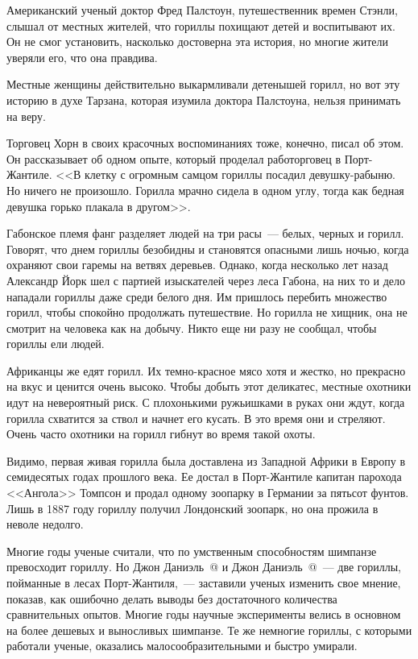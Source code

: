 \documentclass[12pt,a4paper,twoside,openany,svgnames]{memoir}
\makeatletter
\newcommand*{\rom}[1]{\expandafter\@slowromancap\romannumeral #1@}
\makeatother
\begin{document}
Американский ученый доктор Фред Палстоун, путешественник времен Стэнли, слышал от местных жителей, что гориллы похищают детей и воспитывают их. Он не смог установить, насколько достоверна эта история, но многие жители уверяли его, что она правдива.

Местные женщины действительно выкармливали детенышей горилл, но вот эту историю в духе Тарзана, которая изумила доктора Палстоуна, нельзя принимать на веру.

Торговец Хорн в своих красочных воспоминаниях тоже, конечно, писал об этом. Он рассказывает об одном опыте, который проделал работорговец в Порт-Жантиле. <<В клетку с огромным самцом гориллы посадил девушку-рабыню. Но ничего не произошло. Горилла мрачно сидела в одном углу, тогда как бедная девушка горько плакала в другом>>.

Габонское племя фанг разделяет людей на три расы~--- белых, черных и горилл. Говорят, что днем гориллы безобидны и становятся опасными лишь ночью, когда охраняют свои гаремы на ветвях деревьев. Однако, когда несколько лет назад Александр Йорк шел с партией изыскателей через леса Габона, на них то и дело нападали гориллы даже среди белого дня. Им пришлось перебить множество горилл, чтобы спокойно продолжать путешествие. Но горилла не хищник, она не смотрит на человека как на добычу. Никто еще ни разу не сообщал, чтобы гориллы ели людей.

Африканцы же едят горилл. Их темно-красное мясо хотя и жестко, но прекрасно на вкус и ценится очень высоко. Чтобы добыть этот деликатес, местные охотники идут на невероятный риск. С плохонькими ружьишками в руках они ждут, когда горилла схватится за ствол и начнет его кусать. В это время они и стреляют. Очень часто охотники на горилл гибнут во время такой охоты.

Видимо, первая живая горилла была доставлена из Западной Африки в Европу в семидесятых годах прошлого века. Ее достал в Порт-Жантиле капитан парохода <<Ангола>> Томпсон и продал одному зоопарку в Германии за пятьсот фунтов. Лишь в 1887 году гориллу получил Лондонский зоопарк, но она прожила в неволе недолго.

Многие годы ученые считали, что по умственным способностям шимпанзе превосходит гориллу. Но Джон Даниэль~\rom{1} и Джон Даниэль~\rom{2}~--- две гориллы, пойманные в лесах Порт-Жантиля,~--- заставили ученых изменить свое мнение, показав, как ошибочно делать выводы без достаточного количества сравнительных опытов. Многие годы научные эксперименты велись в основном на более дешевых и выносливых шимпанзе. Те же немногие гориллы, с которыми работали ученые, оказались малосообразительными и быстро умирали.
\end{document}

